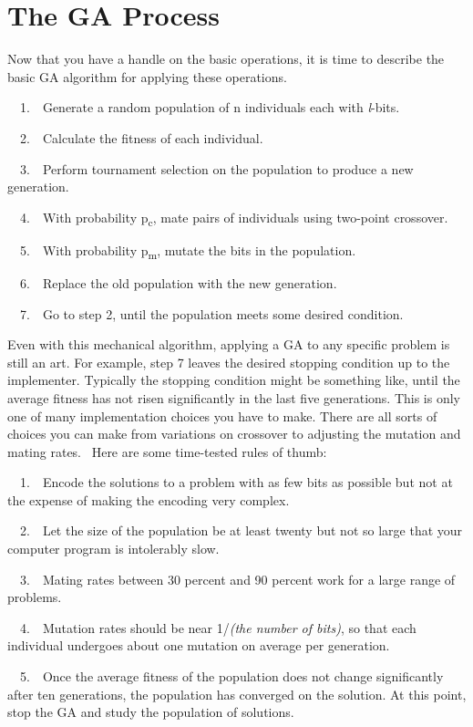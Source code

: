 \section{The GA Process}

Now that you have a handle on the basic operations, it is time to
describe the basic GA algorithm for applying these operations. 

\ \ 1.\ \ Generate a random population of n individuals each with
\textit{l}{}-bits.

\ \ 2.\ \ Calculate the fitness of each individual.

\ \ 3.\ \ Perform tournament selection on the population to produce a
new generation.

\ \ 4.\ \ With probability p\textsubscript{c}, mate pairs of individuals
using two-point crossover.

\ \ 5.\ \ With probability p\textsubscript{m}, mutate the bits in the
population.

\ \ 6.\ \ Replace the old population with the new generation.

\ \ 7.\ \ Go to step 2, until the population meets some desired
condition.

Even with this mechanical algorithm, applying a GA to any specific
problem is still an art. For example, step 7 leaves the desired
stopping condition up to the implementer. Typically the stopping
condition might be something like, until the average fitness has not
risen significantly in the last five generations. This is only one of
many implementation choices you have to make. There are all sorts of
choices you can make from variations on crossover to adjusting the
mutation and mating rates. \ Here are some time-tested rules of thumb:

\ \ 1.\ \ Encode the solutions to a problem with as few bits as possible
but not at the expense of making the encoding very complex. 

\ \ 2.\ \ Let the size of the population be at least twenty but not so
large that your computer program is intolerably slow. 

\ \ 3.\ \ Mating rates between 30 percent and 90 percent work for a
large range of problems.

\ \ 4.\ \ Mutation rates should be near 1/\textit{(the number of bits)},
so that each
individual undergoes about one mutation on average per generation.

\ \ 5.\ \ Once the average fitness of the population does not change
significantly after ten generations, the population has converged on
the solution. At this point, stop the GA and study the population of
solutions.


